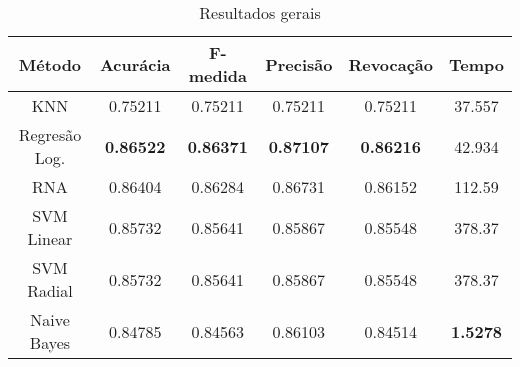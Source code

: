 \begin{table}[h]
\centering
\caption{Resultados gerais}
\vspace{0.2cm}
\begin{tabular}{c|c|c|c|c|c}
Método & Acurácia & F-medida & Precisão & Revocação & Tempo \\
\hline
KNN                & 0.75211 & 0.75211 & 0.75211 & 0.75211 & 37.557 \\
Regresão Log. & \textbf{0.86522} & \textbf{0.86371} & \textbf{0.87107} & \textbf{0.86216} & 42.934 \\
RNA                & 0.86404 & 0.86284 & 0.86731 & 0.86152 & 112.59 \\
SVM Linear         & 0.85732 & 0.85641 & 0.85867 & 0.85548 & 378.37 \\
SVM Radial         & 0.85732 & 0.85641 & 0.85867 & 0.85548 & 378.37 \\
Naive Bayes        & 0.84785 & 0.84563 & 0.86103 & 0.84514 & \textbf{1.5278} \\
\end{tabular}
\label{table:resultadosGerais}
\end{table}


